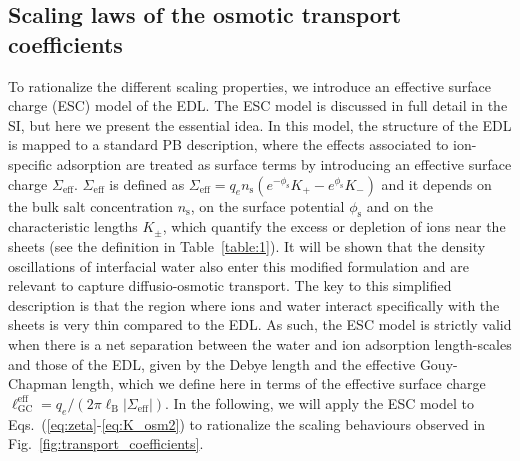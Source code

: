 \documentclass[journal=ancac3,manuscript=article,layout=twocolumn]{achemso}
\newcommand{\lB}{\ell_\text{B}}
\newcommand{\lGC}{\ell_\text{GC}}
\newcommand{\ns}{n_\text{s}}
\begin{document}
\subsection{Scaling laws of the osmotic transport coefficients}
To rationalize the different scaling properties,
we introduce an effective surface charge (ESC) model
of the EDL. The ESC model is discussed in
full detail in the SI, but here we
present the essential idea.
%
In this model, the structure of the EDL
is mapped to a standard PB description,
where the effects associated to ion-specific
adsorption are treated as surface terms by introducing
an effective surface charge $\Sigma_\mathrm{eff}$.
$\Sigma_\text{eff}$ is defined as
$\Sigma_\text{eff} = q_e \ns \left (e^{-\phi_\mathrm{s}} K_+ - e^{\phi_\mathrm{s}}K_- \right)$ and it
depends on the bulk salt concentration $\ns$,
on the surface potential $\phi_\mathrm{s}$ and on the characteristic
lengths $K_{\pm}$, which quantify the excess or
depletion of ions near the sheets (see the definition in Table~\ref{table:1}).
It will be shown that the
density oscillations of interfacial
water also enter this modified formulation
and are relevant to capture
diffusio-osmotic transport.
The key to this simplified description is that
the region where ions and water interact specifically
with the sheets is very thin compared to the EDL.
As such, the ESC model is strictly
valid when there is a net separation between the
water and ion adsorption length-scales
and those of the EDL, given by the Debye length and
the effective Gouy-Chapman length, which we define here in terms
of the effective surface charge
$\lGC^\text{eff}=q_e/\left(2\pi\lB |\Sigma_\mathrm{eff}|\right)$.
In the following, we will apply the ESC model to
Eqs.~(\ref{eq:zeta}-\ref{eq:K_osm2})
to rationalize the scaling behaviours observed in
Fig.~\ref{fig:transport_coefficients}.
\end{document}
